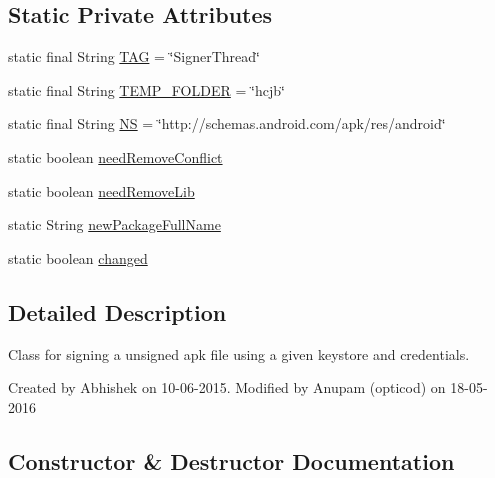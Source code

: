 \subsection*{Static Private Attributes}
\begin{DoxyCompactItemize}
\item 
static final String \hyperlink{classorg_1_1buildmlearn_1_1toolkit_1_1utilities_1_1SignerThread_ab891931f3e23633cfeaa0636420b3183}{T\+AG} = \char`\"{}Signer\+Thread\char`\"{}
\item 
static final String \hyperlink{classorg_1_1buildmlearn_1_1toolkit_1_1utilities_1_1SignerThread_a5665b0a957fa49db69ea448a09c5ce74}{T\+E\+M\+P\+\_\+\+F\+O\+L\+D\+ER} = \char`\"{}hcjb\char`\"{}
\item 
static final String \hyperlink{classorg_1_1buildmlearn_1_1toolkit_1_1utilities_1_1SignerThread_a761195db6bfd06c3afc744631be1fcce}{NS} = \char`\"{}http\+://schemas.\+android.\+com/apk/res/android\char`\"{}
\item 
static boolean \hyperlink{classorg_1_1buildmlearn_1_1toolkit_1_1utilities_1_1SignerThread_ac0f01c5a54553c4429b6fd627761a46f}{need\+Remove\+Conflict}
\item 
static boolean \hyperlink{classorg_1_1buildmlearn_1_1toolkit_1_1utilities_1_1SignerThread_aded48e5927f2e9bb9514bb7d5efd5e59}{need\+Remove\+Lib}
\item 
static String \hyperlink{classorg_1_1buildmlearn_1_1toolkit_1_1utilities_1_1SignerThread_a91fa9f999565e0186dad26acb4d61711}{new\+Package\+Full\+Name}
\item 
static boolean \hyperlink{classorg_1_1buildmlearn_1_1toolkit_1_1utilities_1_1SignerThread_a1960b232fb7931bed6810bfb180c2927}{changed}
\end{DoxyCompactItemize}


\subsection{Detailed Description}
Class for signing a unsigned apk file using a given keystore and credentials. 

Created by Abhishek on 10-\/06-\/2015. Modified by Anupam (opticod) on 18-\/05-\/2016 

\subsection{Constructor \& Destructor Documentation}
